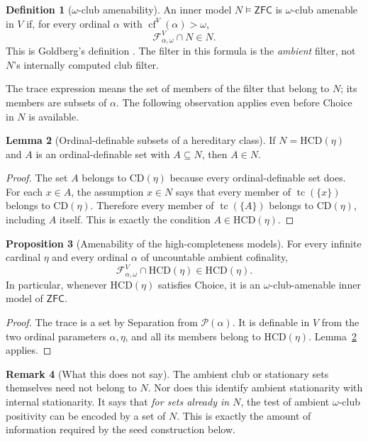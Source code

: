 \documentclass[11pt,letterpaper]{article}
\theoremstyle{definition}
\newtheorem{definition}{Definition}[section]
\newtheorem{proposition}[definition]{Proposition}
\newtheorem{lemma}[definition]{Lemma}
\newtheorem{remark}[definition]{Remark}
\numberwithin{equation}{section}
\newcommand{\ZFC}{\mathsf{ZFC}}
\newcommand{\CD}{\mathrm{CD}}
\newcommand{\HCD}{\mathrm{HCD}}
\newcommand{\cf}{\operatorname{cf}}
\newcommand{\calF}{\mathcal F}
\newcommand{\calP}{\mathcal P}
\newcommand{\tc}{\operatorname{tc}}
\begin{document}
\begin{definition}[$\omega$-club amenability]\label{def:amenable}
An inner model $N\models\ZFC$ is $\omega$-club amenable in $V$ if,
for every ordinal $\alpha$ with $\cf^V(\alpha)>\omega$,
\[
\calF^V_{\alpha,\omega}\cap N\in N.
\]
This is Goldberg's definition \cite[\S2.2]{dichotomy}. The filter in
this formula is the \emph{ambient} filter, not $N$'s internally
computed club filter.
\end{definition}

The trace expression means the set of members of the filter that
belong to $N$; its members are subsets of $\alpha$. The following
observation applies even before Choice in $N$ is available.

\begin{lemma}[Ordinal-definable subsets of a hereditary class]\label{lem:ODclosure}
If $N=\HCD(\eta)$ and $A$ is an ordinal-definable set with
$A\subseteq N$, then $A\in N$.
\end{lemma}
\begin{proof}
The set $A$ belongs to $\CD(\eta)$ because every ordinal-definable set
does. For each $x\in A$, the assumption $x\in N$ says that every
member of $\tc(\{x\})$ belongs to $\CD(\eta)$. Therefore every member
of $\tc(\{A\})$ belongs to $\CD(\eta)$, including $A$ itself.
This is exactly the condition $A\in\HCD(\eta)$.
\end{proof}

\begin{proposition}[Amenability of the high-completeness models]\label{prop:amenable}
For every infinite cardinal $\eta$ and every ordinal $\alpha$ of
uncountable ambient cofinality,
\[
\calF^V_{\alpha,\omega}\cap\HCD(\eta)\in\HCD(\eta).
\]
In particular, whenever $\HCD(\eta)$ satisfies Choice, it is an
$\omega$-club-amenable inner model of $\ZFC$.
\end{proposition}
\begin{proof}
The trace is a set by Separation from $\calP(\alpha)$. It is definable
in $V$ from the two ordinal parameters $\alpha,\eta$, and all its
members belong to $\HCD(\eta)$. Lemma~\ref{lem:ODclosure} applies.
\end{proof}

\begin{remark}[What this does not say]
The ambient club or stationary sets themselves need not belong to
$N$. Nor does this identify ambient stationarity with internal
stationarity. It says that \emph{for sets already in $N$}, the test
of ambient $\omega$-club positivity can be encoded by a set of $N$.
This is exactly the amount of information required by the seed
construction below.
\end{remark}
\end{document}
